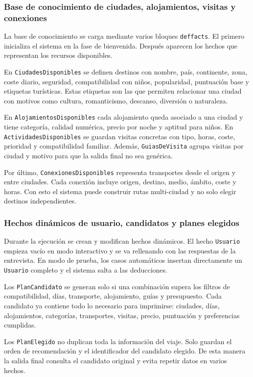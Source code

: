 \documentclass[11pt,a4paper]{article}
\begin{document}
\subsubsection{Base de conocimiento de ciudades, alojamientos, visitas y conexiones}
La base de conocimiento se carga mediante varios bloques \texttt{deffacts}. El
primero inicializa el sistema en la fase de bienvenida. Despu\'es aparecen los
hechos que representan los recursos disponibles.

En \texttt{CiudadesDisponibles} se definen destinos con nombre, pa\'is,
continente, zona, coste diario, seguridad, compatibilidad con ni\~nos,
popularidad, puntuaci\'on base y etiquetas tur\'isticas. Estas etiquetas son las
que permiten relacionar una ciudad con motivos como cultura, romanticismo,
descanso, diversi\'on o naturaleza.

En \texttt{AlojamientosDisponibles} cada alojamiento queda asociado a una
ciudad y tiene categor\'ia, calidad num\'erica, precio por noche y aptitud para
ni\~nos. En \texttt{ActividadesDisponibles} se guardan visitas concretas con
tipo, horas, coste, prioridad y compatibilidad familiar. Adem\'as,
\texttt{GuiasDeVisita} agrupa visitas por ciudad y motivo para que la salida
final no sea gen\'erica.

Por \'ultimo, \texttt{ConexionesDisponibles} representa transportes desde el
origen y entre ciudades. Cada conexi\'on incluye origen, destino, medio, \'ambito,
coste y horas. Con esto el sistema puede construir rutas multi-ciudad y no
solo elegir destinos independientes.

\subsubsection{Hechos din\'amicos de usuario, candidatos y planes elegidos}
Durante la ejecuci\'on se crean y modifican hechos din\'amicos. El hecho
\texttt{Usuario} empieza vac\'io en modo interactivo y se va rellenando con las
respuestas de la entrevista. En modo de prueba, los casos autom\'aticos insertan
directamente un \texttt{Usuario} completo y el sistema salta a las deducciones.

Los \texttt{PlanCandidato} se generan solo si una combinaci\'on supera los
filtros de compatibilidad, d\'ias, transporte, alojamiento, gu\'ias y
presupuesto. Cada candidato ya contiene todo lo necesario para imprimirse:
ciudades, d\'ias, alojamientos, categor\'ias, transportes, visitas, precio,
puntuaci\'on y preferencias cumplidas.

Los \texttt{PlanElegido} no duplican toda la informaci\'on del viaje. Solo
guardan el orden de recomendaci\'on y el identificador del candidato elegido.
De esta manera la salida final consulta el candidato original y evita repetir
datos en varios hechos.
\end{document}
